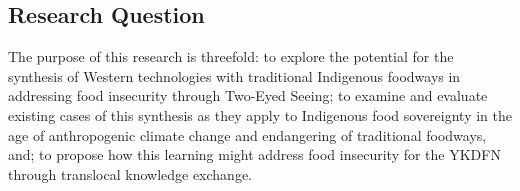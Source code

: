 \documentclass{report}
\begin{document}



\subsection{Research Question}







\hspace{24pt} The purpose of this research is threefold:
to explore the potential for the synthesis of Western technologies with traditional Indigenous foodways in addressing food insecurity through Two-Eyed Seeing;
to examine and evaluate existing cases of this synthesis as they apply to Indigenous food sovereignty in the age of anthropogenic climate change and endangering of traditional foodways, and;
to propose how this learning might address food insecurity for the YKDFN through translocal knowledge exchange.
\end{document}
